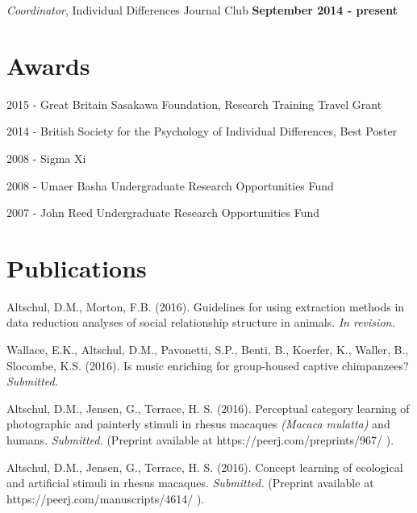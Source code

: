 \documentclass[margin,line]{res}
\newenvironment{list1}{
  \begin{list}{\ding{113}}{%
      \setlength{\itemsep}{0in}
      \setlength{\parsep}{0in} \setlength{\parskip}{0in}
      \setlength{\topsep}{0in} \setlength{\partopsep}{0in} 
      \setlength{\leftmargin}{0.17in}}}{\end{list}}
\begin{document}
\begin{resume}
\vspace{-.2cm}
{\em Coordinator}, Individual Differences Journal Club \hfill   {\bf September 2014 - present}\\
\vspace{-.5cm}


\vspace{1cm}

\section{\sc Awards} 
\begin{list1}

\item[2015] - Great Britain Sasakawa Foundation, Research Training Travel Grant
\item[2014] - British Society for the Psychology of Individual Differences, Best Poster
\item[2008] - Sigma Xi
\item[2008] - Umaer Basha Undergraduate Research Opportunities Fund
\item[2007] - John Reed Undergraduate Research Opportunities Fund

\end{list1}

\vspace{1cm}

\section{\sc Publications} 


Altschul, D.M., Morton, F.B. (2016). Guidelines for using extraction methods in data reduction analyses of social relationship structure in animals.  {\it In revision.}

Wallace, E.K., Altschul, D.M., Pavonetti, S.P., Benti, B., Koerfer, K., Waller, B., Slocombe, K.S. (2016). Is music enriching for group-housed captive chimpanzees?  {\it Submitted.}

Altschul, D.M., Jensen, G.,  Terrace, H. S. (2016). Perceptual category learning of photographic and painterly stimuli in rhesus macaques {\it (Macaca mulatta)} and humans.  {\it Submitted.} (Preprint available at https://peerj.com/preprints/967/ ).

Altschul, D.M., Jensen, G.,  Terrace, H. S. (2016). Concept learning of ecological and artificial stimuli in rhesus macaques. {\it Submitted.} (Preprint available at https://peerj.com/manuscripts/4614/ ).


\end{resume}
\end{document}
